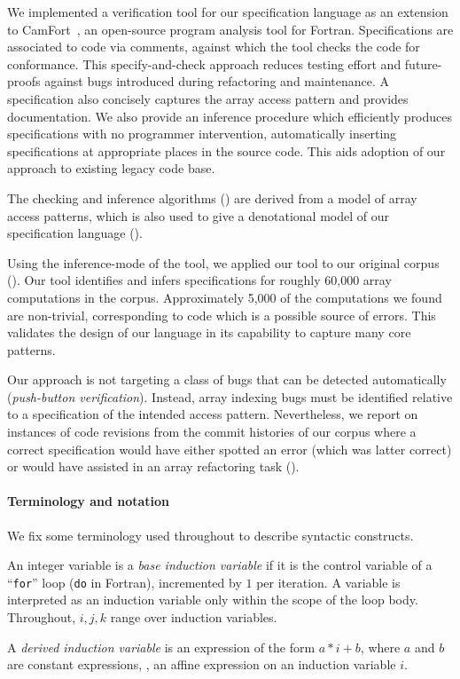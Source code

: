 We implemented a verification tool for our specification language as
an extension to CamFort~\cite{camfort}, an open-source program
analysis tool for Fortran. Specifications are associated to code via
comments, against which the tool checks the code for conformance. This
specify-and-check approach reduces testing effort and future-proofs
against bugs introduced during refactoring and maintenance. A
specification also concisely captures the array access pattern 
and provides documentation. We also provide an inference procedure
which efficiently produces specifications with no programmer
intervention, automatically inserting specifications at appropriate
places in the source code. This aids adoption of our approach to
existing legacy code base.

The checking and inference algorithms () are
derived from a model of array access patterns, which is also used to
give a denotational model of our specification language
().

Using the inference-mode of the tool, we applied our tool to our
original corpus (). Our tool identifies and
infers specifications for roughly 60,000 array computations in the
corpus. Approximately 5,000 of the computations we found are non-trivial,
corresponding to code which is a possible source of errors. This
validates the design of our language in its capability to capture many
core patterns.

Our approach is not targeting a class of bugs that can be detected
automatically (\emph{push-button verification}). Instead, array
indexing bugs must be identified relative to a specification of the
intended access pattern.  Nevertheless, we report on instances of code
revisions from the commit histories of our corpus where a
correct specification would have either spotted an error (which was
latter correct) or would have assisted in an array refactoring task
().

\paragraph{Terminology and notation}

We fix some terminology used throughout to describe
syntactic constructs.

\begin{defn}
  An integer variable is a \emph{base induction variable} if it is the
  control variable of a ``\texttt{for}'' loop (\texttt{do} in
  Fortran), incremented by $1$ per iteration. A variable is
  interpreted as an induction variable only within the scope of the
  loop body. Throughout, $i, j, k$ range over induction variables.

  A \emph{derived induction variable} is an expression of the form
  $a \ast i + b$, where $a$ and $b$ are constant expressions, \ie{},
  an affine expression on an induction variable $i$.
\end{defn}

